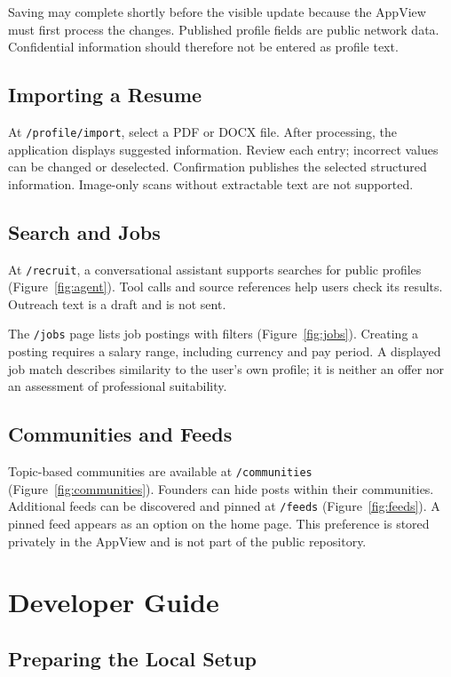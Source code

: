 \documentclass[11pt,a4paper]{article}
\newcommand{\code}[1]{\texttt{#1}}
\begin{document}
Saving may complete shortly before the visible update because the AppView must first process the changes. Published profile fields are public network data. Confidential information should therefore not be entered as profile text.

\subsection{Importing a Resume}

At \code{/profile/import}, select a PDF or DOCX file. After processing, the application displays suggested information. Review each entry; incorrect values can be changed or deselected. Confirmation publishes the selected structured information. Image-only scans without extractable text are not supported.

\subsection{Search and Jobs}

At \code{/recruit}, a conversational assistant supports searches for public profiles (Figure~\ref{fig:agent}). Tool calls and source references help users check its results. Outreach text is a draft and is not sent.

The \code{/jobs} page lists job postings with filters (Figure~\ref{fig:jobs}). Creating a posting requires a salary range, including currency and pay period. A displayed job match describes similarity to the user's own profile; it is neither an offer nor an assessment of professional suitability.

\subsection{Communities and Feeds}

Topic-based communities are available at \code{/communities} (Figure~\ref{fig:communities}). Founders can hide posts within their communities. Additional feeds can be discovered and pinned at \code{/feeds} (Figure~\ref{fig:feeds}). A pinned feed appears as an option on the home page. This preference is stored privately in the AppView and is not part of the public repository.

\section{Developer Guide}

\subsection{Preparing the Local Setup}
\end{document}
